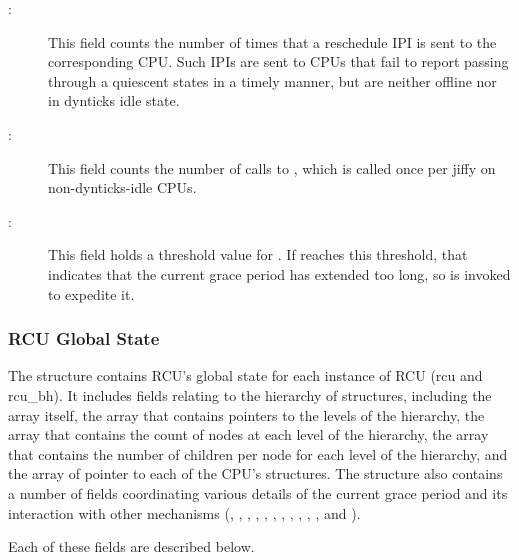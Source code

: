 \begin{description}
\item[:]
	This field counts the number of times that a reschedule IPI
	is sent to the corresponding CPU.
	Such IPIs are sent to CPUs that fail to report passing through
	a quiescent states in a timely manner, but are neither offline
	nor in dynticks idle state.
\item[:]
	This field counts the number of calls to ,
	which is called once per jiffy on non-dynticks-idle CPUs.
\item[:]
	This field holds a threshold value for .
	If  reaches this threshold, that indicates
	that the current grace period has extended too long, so
	 is invoked to expedite it.
\end{description}

\subsubsection{RCU Global State}
\label{app:rcuimpl:rcutreewt:RCU Global State}

The  structure contains RCU's global state for
each instance of RCU (rcu and rcu\_bh).
It includes fields relating to
the hierarchy of  structures, including
the  array itself,
the  array that contains
pointers to the levels of the hierarchy,
the  array that contains the count of nodes at each level
of the hierarchy,
the  array that contains the number of children
per node for each level of the hierarchy,
and the  array of pointer to each of the CPU's
 structures.
The  structure also contains a number of fields
coordinating various details of the current grace period and its
interaction with other mechanisms (,
, , , ,
, , ,
, , ,
and ).

Each of these fields are described below.

